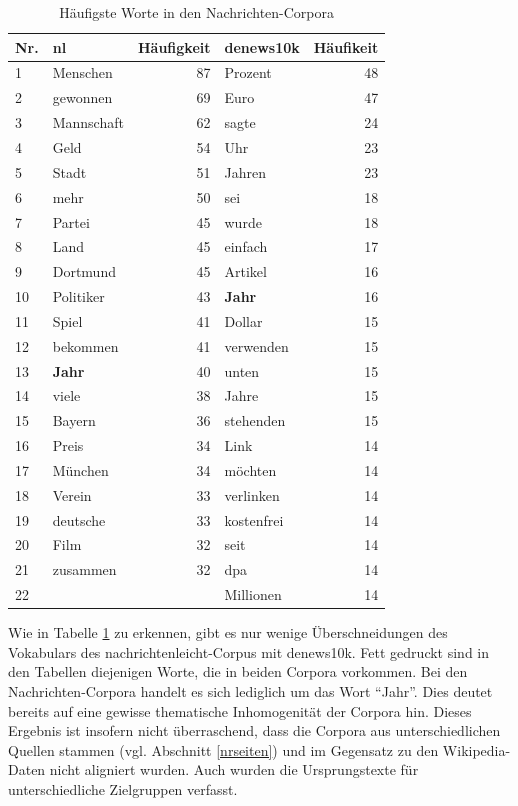 \documentclass[11pt, a4paper]{article}
\begin{document}
\begin{table}[ht]
    \begin{tabular}{l*{2}{lr}}
    \toprule
    Nr. & nl & Häufigkeit & denews10k & Häufikeit\\
    \midrule
    1  & Menschen    & 87 &  Prozent     & 48 \\
    2  & gewonnen    & 69 &  Euro        & 47 \\
    3  & Mannschaft  & 62 &  sagte       & 24 \\
    4  & Geld        & 54 &  Uhr         & 23 \\
    5  & Stadt       & 51 &  Jahren      & 23 \\
    6  & mehr        & 50 &  sei         & 18 \\
    7  & Partei      & 45 &  wurde       & 18 \\
    8  & Land        & 45 &  einfach     & 17 \\
    9  & Dortmund    & 45 &  Artikel     & 16 \\
    10 & Politiker   & 43 &  \textbf{Jahr}        & 16 \\
    11 & Spiel       & 41 &  Dollar      & 15 \\
    12 & bekommen    & 41 &  verwenden   & 15 \\
    13 & \textbf{Jahr}        & 40 &  unten       & 15 \\
    14 & viele       & 38 &  Jahre       & 15 \\
    15 & Bayern      & 36 &  stehenden   & 15 \\
    16 & Preis       & 34 &  Link        & 14 \\
    17 & München     & 34 &  möchten     & 14 \\
    18 & Verein      & 33 &  verlinken   & 14 \\
    19 & deutsche    & 33 &  kostenfrei  & 14 \\
    20 & Film        & 32 &  seit        & 14 \\
    21 & zusammen    & 32 &  dpa         & 14 \\
    22 &             &    &  Millionen   & 14 \\
    \bottomrule
    \end{tabular}
    \caption{Häufigste Worte in den Nachrichten-Corpora}
    \label{words-nachrichten}
\end{table}

Wie in Tabelle \ref{words-nachrichten} zu erkennen, gibt es nur wenige
Überschneidungen des Vokabulars des nachrichtenleicht-Corpus mit denews10k.
Fett gedruckt sind in den Tabellen diejenigen Worte, die in beiden Corpora
vorkommen.
Bei den Nachrichten-Corpora handelt es sich lediglich um das Wort "`Jahr"'.
Dies deutet bereits auf eine gewisse thematische Inhomogenität der Corpora hin.
Dieses Ergebnis ist insofern nicht überraschend, dass die Corpora aus
unterschiedlichen Quellen stammen (vgl. Abschnitt \ref{nrseiten}) und
im Gegensatz zu den Wikipedia-Daten nicht aligniert wurden.
Auch wurden die Ursprungstexte für unterschiedliche Zielgruppen verfasst.
\end{document}
